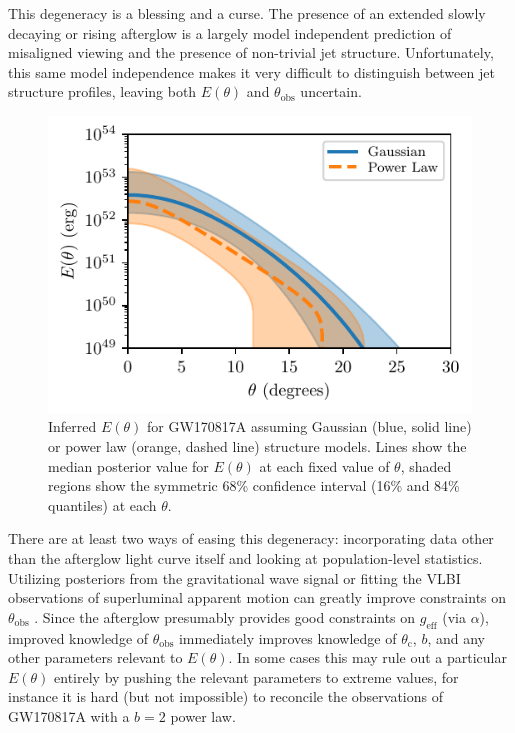 \documentclass[twocolumn]{aastex62}
\newcommand{\gwbns}{GW170817A}
\newcommand{\thobs}{\ensuremath{\theta_{\mathrm{obs}}}}
\newcommand{\thC}{\ensuremath{\theta_{\mathrm{c}}}}
\newcommand{\geff}{\ensuremath{g_{\mathrm{eff}}}}
\begin{document}
This degeneracy is a blessing and a curse.  The presence of an extended slowly decaying or rising afterglow is a largely model independent prediction of misaligned viewing and the presence of non-trivial jet structure.  Unfortunately, this same model independence makes it very difficult to distinguish between jet structure profiles, leaving both $E(\theta)$ and $\thobs$ uncertain.

\begin{figure}
	\includegraphics[width=\columnwidth]{figs/fit_E_theta.pdf}
	\caption{Inferred $E(\theta)$ for \gwbns{} assuming Gaussian (blue, solid line) or power law (orange, dashed line) structure models.  Lines show the median posterior value for $E(\theta)$ at each fixed value of $\theta$, shaded regions show the symmetric 68\% confidence interval (16\% and 84\% quantiles) at each $\theta$. \label{fig:fit_E_theta.pdf}}
\end{figure}

There are at least two ways of easing this degeneracy: incorporating data other than the afterglow light curve itself and looking at population-level statistics.  Utilizing posteriors from the gravitational wave signal or fitting the VLBI observations of superluminal apparent motion can greatly improve constraints on $\thobs$ \citep{Troja:2018aa, Hotokezaka:2018aa, Ghirlanda:2019aa}.  Since the afterglow presumably provides good constraints on $\geff$ (via $\alpha$), improved knowledge of $\thobs$ immediately improves knowledge of $\thC$, $b$, and any other parameters relevant to $E(\theta)$.  In some cases this may rule out a particular $E(\theta)$ entirely by pushing the relevant parameters to extreme values, for instance it is hard (but not impossible) to reconcile the observations of \gwbns{} with a $b=2$ power law.
\end{document}
